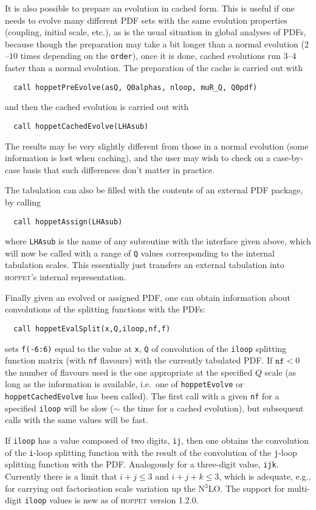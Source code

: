 \documentclass[12pt]{article}
\newcommand{\ie}{i.e.\ }
\newcommand{\hoppet}{\textsc{hoppet}\xspace}
\newcommand{\ttt}[1]{\texttt{#1}}
\begin{document}
It is also possible to prepare an evolution in cached form. This is
useful if one needs to evolve many different PDF sets with the same
evolution properties (coupling, initial scale, etc.), as is the
usual situation in global analyses of PDFs, because though
the preparation may take a bit longer than a normal evolution
($2$--$10$ times depending on the \ttt{order}), once it is done,
cached evolutions run $3$--$4$ faster than a normal evolution. The
preparation of the cache is carried out with
\begin{lstlisting}
  call hoppetPreEvolve(asQ, Q0alphas, nloop, muR_Q, Q0pdf)
\end{lstlisting}
and then the cached evolution is carried out with 
\begin{lstlisting}
  call hoppetCachedEvolve(LHAsub)
\end{lstlisting}
The results may be very slightly different from those in a normal
evolution (some information is lost when caching), and the user 
may wish to check on a case-by-case basis that such differences
don't matter in practice.

The tabulation can also be filled with the contents of an external PDF
package, by calling
\begin{lstlisting}
  call hoppetAssign(LHAsub)
\end{lstlisting}
where \ttt{LHAsub} is the name of any subroutine with the interface
given above, which will now be called with a range of \ttt{Q} values
corresponding to the internal tabulation scales. This essentially just
transfers an external tabulation into \hoppet's internal
representation. 

Finally given an evolved or assigned PDF, one can obtain information
about convolutions of the splitting functions with the PDFs:
\begin{lstlisting}
  call hoppetEvalSplit(x,Q,iloop,nf,f)
\end{lstlisting}
sets \ttt{f(-6:6)} equal to the value at \ttt{x}, \ttt{Q} of
convolution of the \ttt{iloop} splitting function matrix (with
\ttt{nf} flavours) with the currently tabulated PDF. If $\ttt{nf}<0$
the number of flavours used is the one appropriate at the specified
$Q$ scale (as long as the information is available, \ie one of
\ttt{hoppetEvolve} or \ttt{hoppetCachedEvolve} has been called). The
first call with a given \ttt{nf} for a specified \ttt{iloop} will be
slow ($\sim$ the time for a cached evolution), but subsequent calls
with the same values will be fast.

If \ttt{iloop} has a value composed of two digits, \ttt{ij},
then one obtains the convolution of the \ttt{i}-loop splitting function
with the result of the convolution of the \ttt{j}-loop splitting
function with the PDF. 
%
Analogously for a three-digit value, \ttt{ijk}.
%
Currently there is a limit that $i+j \le 3$ and $i+j+k \le 3$, which
is adequate, e.g., for carrying out factorisation scale variation up
the N$^3$LO.
%
The support for multi-digit \ttt{iloop} values is new as of \hoppet
version 1.2.0.
\end{document}

